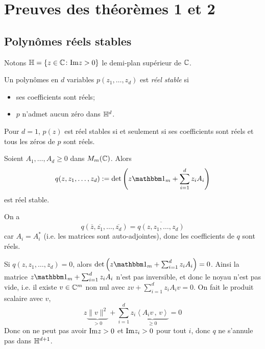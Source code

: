 
\chapter{Preuves des théorèmes 1 et 2}

\section{Polynômes réels stables}

Notons $\mathbb{H} = \{z \in \mathbb{C} \colon \mathrm{Im} z > 0\}$ le demi-plan supérieur de $\mathbb{C}$.

\begin{defi}
  Un polynômes en $d$ variables $p(z_1, \ldots, z_d)$ est \emph{réel stable} si
  \begin{itemize}
  \item ses coefficients sont réels;
  \item $p$ n'admet aucun zéro dans $\mathbb{H}^d$.
  \end{itemize}

\end{defi}

\begin{ex}
  Pour $d = 1$, $p(z)$ est réel stables si et seulement si ses coefficients sont réels et tous les zéros de
  $p$ sont réels.
\end{ex}

\begin{prop}
  \label{prop:1}
  Soient $A_1, \ldots, A_d \geq 0$ dans $M_m(\mathbb{C})$. Alors 
  \[ q(z, z_1, \ldots, z_d) := \det\left( z \un_m + \sum_{i = 1}^{d} z_i A_i \right) \]
  est réel stable.
\end{prop}

\begin{preuve}
  On a 
  \[ q(\overline{z}, \overline{z_1}, \ldots, \overline{z_d}) = \overline{q(z, z_1, \ldots, z_d)} \]
  car $A_i = A_i^\ast$ (i.e. les matrices sont auto-adjointes), donc les coefficients de $q$ sont réels.

  Si $q(z, z_1, \ldots, z_d) = 0$, alors $\det \left( z \un_m + \sum_{i = 1}^{d}z_i A_i\right) = 0$. Ainsi la
  matrice $z \un_m + \sum_{i = 1}^{d} z_i A_i$ n'est pas inversible, et donc le noyau n'est pas vide, i.e. il
  existe $v \in \mathbb{C}^m$ non nul avec $zv + \sum_{i = 1}^{d}z_i A_i v = 0$. On fait le produit scalaire avec $v$, 
  \[ z\underbrace{\|v\|^2}_{> 0} + \sum_{i = 1}^{d}z_i \underbrace{\left \langle A_i v\, ,\, v \right\rangle}_{\geq 0} = 0 \]
  Donc on ne peut pas avoir $\mathrm{Im} z > 0$ et $\mathrm{Im} z_i > 0$ pour tout $i$, donc $q$ ne s'annule pas dans $\mathbb{H}^{d
    + 1}$.
\end{preuve}











